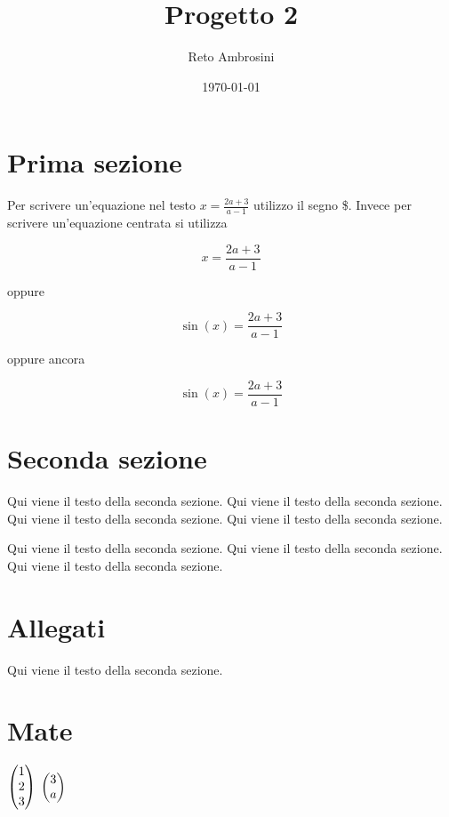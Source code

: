 \documentclass[a4paper,12pt]{scrartcl}
\title{Progetto 2}
\author{Reto Ambrosini}
\date{\today}
\begin{document}
	
	\maketitle
	
\newpage

	\tableofcontents

\newpage

\section{Prima sezione}

Per scrivere un'equazione nel testo $ x=\frac{2a+3}{a-1} $ utilizzo il segno \$.
Invece per scrivere un'equazione centrata si utilizza

\[ x=\frac{2a+3}{a-1} \]

oppure

$$ \sin(x)=\frac{2a+3}{a-1} $$

oppure ancora

\begin{equation}
	\sin(x)=\frac{2a+3}{a-1} 
\end{equation}


\section[Due]{Seconda sezione}
	
Qui viene il testo della seconda sezione.
Qui viene il testo della seconda sezione.
Qui viene il testo della seconda sezione.
Qui viene il testo della seconda sezione.

\vspace{2mm}
Qui viene il testo della seconda sezione.
Qui viene il testo della seconda sezione.
Qui viene il testo della seconda sezione.


\section*{Allegati}

Qui viene il testo della seconda sezione.



\section{Mate}

$\vvec{1,2,3}$  $\vvec{3,a}$
\end{document}
